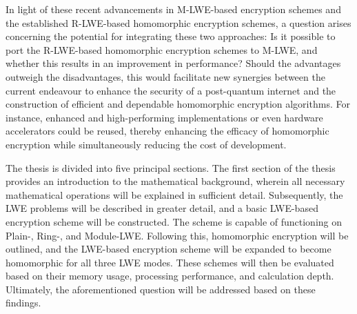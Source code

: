 
In light of these recent advancements in M-LWE-based encryption schemes and the established R-LWE-based homomorphic encryption schemes, a question arises concerning the potential for integrating these two approaches: Is it possible to port the R-LWE-based homomorphic encryption schemes to M-LWE, and whether this results in an improvement in performance? Should the advantages outweigh the disadvantages, this would facilitate new synergies between the current endeavour to enhance the security of a post-quantum internet and the construction of efficient and dependable homomorphic encryption algorithms. For instance, enhanced and high-performing implementations or even hardware accelerators could be reused, thereby enhancing the efficacy of homomorphic encryption while simultaneously reducing the cost of development.

The thesis is divided into five principal sections. The first section of the thesis provides an introduction to the mathematical background, wherein all necessary mathematical operations will be explained in sufficient detail. Subsequently, the LWE problems will be described in greater detail, and a basic LWE-based encryption scheme will be constructed. The scheme is capable of functioning on Plain-, Ring-, and Module-LWE. Following this, homomorphic encryption will be outlined, and the LWE-based encryption scheme will be expanded to become homomorphic for all three LWE modes. These schemes will then be evaluated based on their memory usage, processing performance, and calculation depth. Ultimately, the aforementioned question will be addressed based on these findings.
